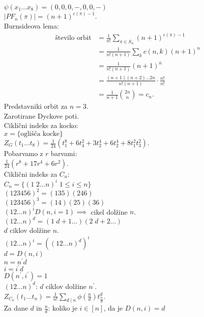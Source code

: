 \documentclass[a4paper, 12pt]{book}
\theoremstyle{definition}
\theoremstyle{remark}
\begin{document}
$\psi(x_1 \dots x_8) = (0, 0, 0, -, 0, 0, -)$ \\
$|PF_n(\pi)| = (n+1)^{c(\pi)-1}$. \\
Burnsideova lema:
\begin{align*}
  \text{število orbit} &= \frac{1}{n!} \sum_{\pi \in S_n} (n+1)^{c(\pi)-1} \\
  &= \frac{1}{n! (n+1)} \sum_k c(n, k) (n+1)^n \\
  &= \frac{1}{n! (n+1)} (n+1)^{\overline{n}} \\
  &= \frac{(n+1) (n+2) \dots 2n}{n! (n+1)} \cdot \frac{n!}{n!} \\
  &= \frac{1}{n+1} \binom{2n}{n} = c_n.
\end{align*}
Predstavniki orbit za $n=3$. \\
Zarotirane Dyckove poti. \\
Ciklični indeks za kocko: \\
$x = \{\text{oglišča kocke}\}$ \\
$Z_G(t_1 \dots t_8) = \frac{1}{24} \left(t_1^8 + 6 t_4^2 + 3 t_2^4 + 6 t_2^4 + 8 t_1^2 t_3^2\right)$. \\
Pobarvamo z $r$ barvami: \\
$\frac{1}{24} \left(r^8 + 17r^4 + 6r^2\right)$. \\
Ciklični indeks za $C_n$: \\
$C_n = \{(1 \; 2 \dots n)^i \; 1 \leq i \leq n\}$ \\
$(1 2 3 4 5 6)^2 = (1 3 5) (2 4 6)$ \\
$(1 2 3 4 5 6)^3 = (1 4) (2 5) (3 6)$ \\
$(1 2 \dots n)^i D(n, i = 1) \implies$ cikel dolžine $n$. \\
$(1 2 \dots n)^d = (1 \; d+1 \dots) (2 \; d+2 \dots)$ \\
$d$ ciklov dolžine $n$. \\
$(1 2 \dots n)^i = \left( (1 2 \dots n)^d \right)^i$ \\
$d = D(n, i)$ \\
$n = n^{'} d$ \\
$i = i^{'} d$ \\
$D(n^{'}, i^{'}) = 1$ \\
$(1 2 \dots n)^d$: $d$ ciklov dolžine $n^{'}$. \\
$Z_{C_n}(t_1 \dots t_n) = \frac{1}{n!} \sum_{d \mid n} \phi\left(\frac{n}{d}\right) t_{\frac{n}{d}}^d$. \\
Za dane $d$ in $\frac{n}{d}$: koliko je $i \in [n]$, da je $D(n, i) = d$ \\
\end{document}
